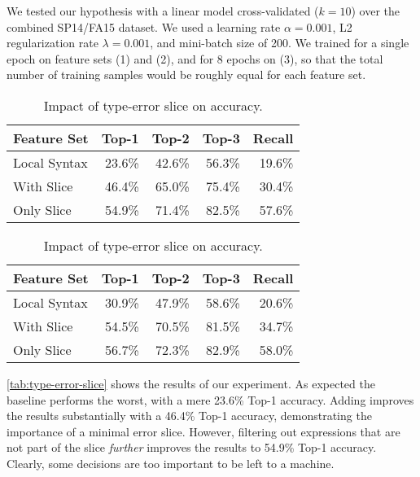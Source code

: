 We tested our hypothesis with a linear model cross-validated ($k=10$)
over the combined SP14/FA15 dataset. We used a learning rate
$\alpha=0.001$, L2 regularization rate $\lambda=0.001$, and mini-batch
size of 200. We trained for a single epoch on feature sets (1) and
(2), and for 8 epochs on (3), so that the total number of training samples
would be roughly equal for each feature set.

\begin{table}[ht]
  \begin{minipage}{0.49\linewidth}
  \centering
  \linear
  \begin{tabular}{lrrrr}
    \toprule
    Feature Set  & Top-1  & Top-2  & Top-3  & Recall \\
    \midrule
    Local Syntax & 23.6\% & 42.6\% & 56.3\% & 19.6\% \\
    With Slice   & 46.4\% & 65.0\% & 75.4\% & 30.4\% \\
    Only Slice   & 54.9\% & 71.4\% & 82.5\% & 57.6\% \\
    \bottomrule
  \end{tabular}
  \end{minipage}
  \begin{minipage}{0.49\linewidth}
  \centering
  \hiddenF
  \begin{tabular}{lrrrr}
    \toprule
    Feature Set  & Top-1  & Top-2  & Top-3  & Recall \\
    \midrule
    Local Syntax & 30.9\% & 47.9\% & 58.6\% & 20.6\% \\
    With Slice   & 54.5\% & 70.5\% & 81.5\% & 34.7\% \\
    Only Slice   & 56.7\% & 72.3\% & 82.9\% & 58.0\% \\
    \bottomrule
  \end{tabular}
  \end{minipage}
  \caption{
    Impact of type-error slice on accuracy.
  }\label{tab:type-error-slice}
\end{table}

\autoref{tab:type-error-slice} shows the results of our experiment.
%
As expected the baseline performs the worst, with a mere 23.6\% Top-1
accuracy.
%
Adding \InSlice improves the results substantially with a 46.4\% Top-1
accuracy, demonstrating the importance of a minimal error slice.
%
However, filtering out expressions that are not part of the slice
\emph{further} improves the results to 54.9\% Top-1 accuracy.
%
Clearly, some decisions are too important to be left to a machine.

